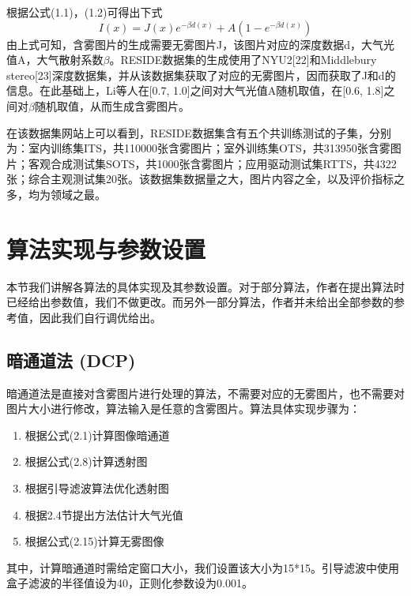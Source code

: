 \documentclass[a4paper, 12pt]{report}
\begin{document}
根据公式(1.1)，(1.2)可得出下式
\begin{equation}
I(x) = J(x) e^{-\beta d(x)} + A(1 - e^{-\beta d(x)})
\end{equation}
由上式可知，含雾图片的生成需要无雾图片J，该图片对应的深度数据d，大气光值A，大气散射系数$\beta$。RESIDE数据集的生成使用了NYU2[22]和Middlebury stereo[23]深度数据集，并从该数据集获取了对应的无雾图片，因而获取了J和d的信息。在此基础上，Li等人在[0.7, 1.0]之间对大气光值A随机取值，在[0.6, 1.8]之间对$\beta$随机取值，从而生成含雾图片。

在该数据集网站上可以看到，RESIDE数据集含有五个共训练测试的子集，分别为：室内训练集ITS，共110000张含雾图片；室外训练集OTS，共313950张含雾图片；客观合成测试集SOTS，共1000张含雾图片；应用驱动测试集RTTS，共4322张；综合主观测试集20张。该数据集数据量之大，图片内容之全，以及评价指标之多，均为领域之最。

\section{算法实现与参数设置\quad}
本节我们讲解各算法的具体实现及其参数设置。对于部分算法，作者在提出算法时已经给出参数值，我们不做更改。而另外一部分算法，作者并未给出全部参数的参考值，因此我们自行调优给出。

\subsection{暗通道法 (DCP)\quad}
	暗通道法是直接对含雾图片进行处理的算法，不需要对应的无雾图片，也不需要对图片大小进行修改，算法输入是任意的含雾图片。算法具体实现步骤为：
\begin{enumerate}
\item 根据公式(2.1)计算图像暗通道
\item 根据公式(2.8)计算透射图
\item 根据引导滤波算法优化透射图
\item 根据2.4节提出方法估计大气光值
\item 根据公式(2.15)计算无雾图像
\end{enumerate}

其中，计算暗通道时需给定窗口大小，我们设置该大小为15*15。引导滤波中使用盒子滤波的半径值设为40，正则化参数设为0.001。
\end{document}
